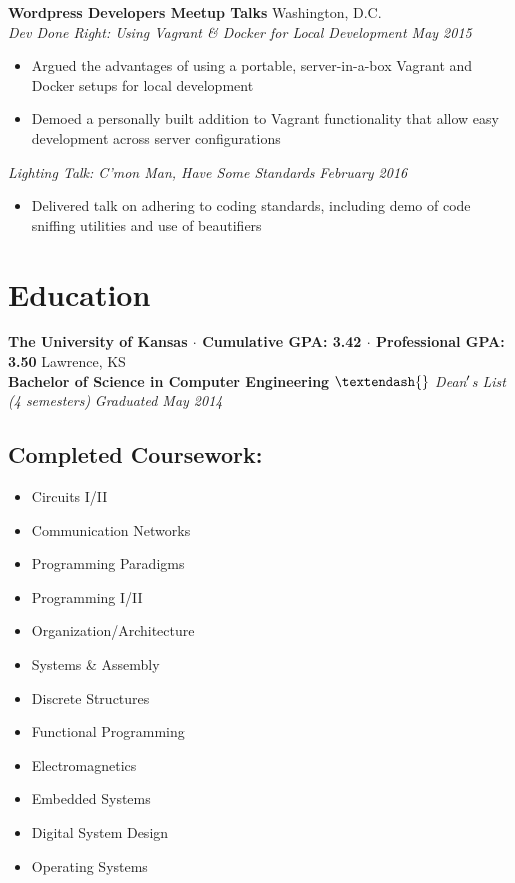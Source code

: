 \documentclass[10pt]{article}
\begin{document}
\textbf{Wordpress Developers Meetup Talks} \hfill Washington, D.C. \\
\textit{Dev Done Right: Using Vagrant \& Docker for Local Development \hfill May 2015} \\
\vspace{-1em}
\begin{itemize}
  \item Argued the advantages of using a portable, server-in-a-box Vagrant and Docker setups for local development
  \item Demoed a personally built addition to Vagrant functionality that allow easy development across server configurations
\end{itemize}
\textit{Lighting Talk: C'mon Man, Have Some Standards \hfill February 2016} \\
\vspace{-1em}
\begin{itemize}
  \item Delivered talk on adhering to coding standards, including demo of code sniffing utilities and use of beautifiers
\end{itemize}

\section*{Education}
\textbf{The University of Kansas $\cdot$ Cumulative GPA: 3.42 $\cdot$ Professional GPA: 3.50}
\hfill
Lawrence, KS \\
\textbf{Bachelor of Science in Computer Engineering}
\textit{$\textendash{}$ Dean$\rq$s List (4 semesters)}
\hfill
\textit{Graduated May 2014}
\subsection*{Completed Coursework:}
\begin{multicols}{4}
  \begin{itemize}
    \item Circuits I/II
    \item Communication Networks
    \item Programming Paradigms
    \item Programming I/II
    \item Organization/Architecture
    \item Systems \& Assembly
    \item Discrete Structures
    \item Functional Programming
    \item Electromagnetics
    \item Embedded Systems
    \item Digital System Design
    \item Operating Systems
  \end{itemize}
\end{multicols}
\end{document}
